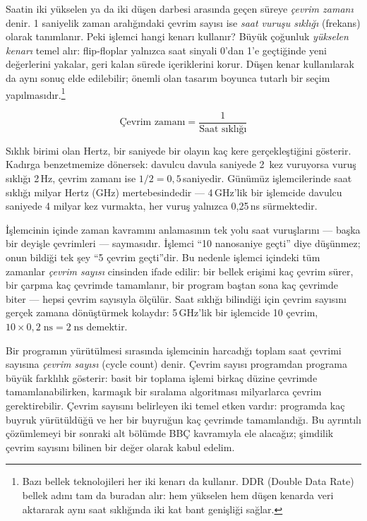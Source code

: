Saatin iki yükselen ya da iki düşen darbesi arasında geçen süreye \emph{çevrim zamanı} denir. 1 saniyelik zaman aralığındaki çevrim sayısı ise \emph{saat vuruşu sıklığı} (frekans) olarak tanımlanır. Peki işlemci hangi kenarı kullanır? Büyük çoğunluk \emph{yükselen kenarı} temel alır: flip-floplar yalnızca saat sinyali 0'dan 1'e geçtiğinde yeni değerlerini yakalar, geri kalan sürede içeriklerini korur. Düşen kenar kullanılarak da aynı sonuç elde edilebilir; önemli olan tasarım boyunca tutarlı bir seçim yapılmasıdır.\footnote{Bazı bellek teknolojileri her iki kenarı da kullanır. DDR (Double Data Rate) bellek adını tam da buradan alır: hem yükselen hem düşen kenarda veri aktararak aynı saat sıklığında iki kat bant genişliği sağlar.}

\begin{equation}
\text{Çevrim zamanı} = \frac{1}{\text{Saat sıklığı}}
\label{eq:cevrim-zamani}
\end{equation}

Sıklık birimi olan Hertz, bir saniyede bir olayın kaç kere gerçekleştiğini gösterir. Kadırga benzetmemize dönersek: davulcu davula saniyede 2~kez vuruyorsa vuruş sıklığı 2\,Hz, çevrim zamanı ise $1/2 = 0{,}5$\,saniyedir. Günümüz işlemcilerinde saat sıklığı milyar Hertz (GHz) mertebesindedir --- 4\,GHz'lik bir işlemcide davulcu saniyede 4 milyar kez vurmakta, her vuruş yalnızca 0,25\,ns sürmektedir.

İşlemcinin içinde zaman kavramını anlamasının tek yolu saat vuruşlarını --- başka bir deyişle çevrimleri --- saymasıdır. İşlemci ``10 nanosaniye geçti'' diye düşünmez; onun bildiği tek şey ``5 çevrim geçti''dir. Bu nedenle işlemci içindeki tüm zamanlar \emph{çevrim sayısı} cinsinden ifade edilir: bir bellek erişimi kaç çevrim sürer, bir çarpma kaç çevrimde tamamlanır, bir program baştan sona kaç çevrimde biter --- hepsi çevrim sayısıyla ölçülür. Saat sıklığı bilindiği için çevrim sayısını gerçek zamana dönüştürmek kolaydır: 5\,GHz'lik bir işlemcide 10 çevrim, $10 \times 0{,}2\;\text{ns} = 2\;\text{ns}$ demektir.

Bir programın yürütülmesi sırasında işlemcinin harcadığı toplam saat çevrimi sayısına \emph{çevrim sayısı} (cycle count) denir. Çevrim sayısı programdan programa büyük farklılık gösterir: basit bir toplama işlemi birkaç düzine çevrimde tamamlanabilirken, karmaşık bir sıralama algoritması milyarlarca çevrim gerektirebilir. Çevrim sayısını belirleyen iki temel etken vardır: programda kaç buyruk yürütüldüğü ve her bir buyruğun kaç çevrimde tamamlandığı. Bu ayrıntılı çözümlemeyi bir sonraki alt bölümde BBÇ kavramıyla ele alacağız; şimdilik çevrim sayısını bilinen bir değer olarak kabul edelim.

